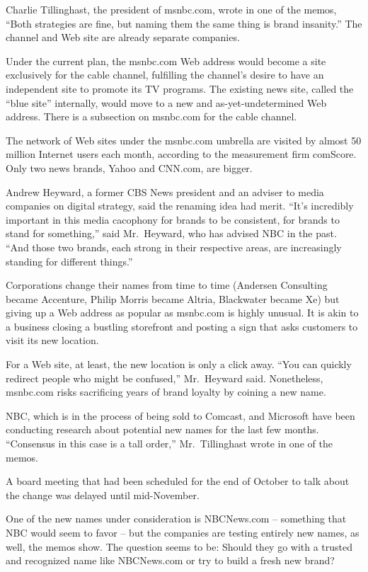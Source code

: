 ﻿\documentclass[12pt]{article}
\begin{document}
Charlie Tillinghast, the president of msnbc.com, wrote in one of the memos, ``Both strategies are
fine, but naming them the same thing is brand insanity.'' The channel and Web site are already
separate companies.

Under the current plan, the msnbc.com Web address would become a site exclusively for the cable
channel, fulfilling the channel's desire to have an independent site to promote its TV programs. The
existing news site, called the ``blue site'' internally, would move to a new and as-yet-undetermined
Web address. There is a subsection on msnbc.com for the cable channel.

The network of Web sites under the msnbc.com umbrella are visited by almost 50 million Internet
users each month, according to the measurement firm comScore. Only two news brands, Yahoo and
CNN.com, are bigger.

Andrew Heyward, a former CBS News president and an adviser to media companies on digital strategy,
said the renaming idea had merit. ``It's incredibly important in this media cacophony for brands to
be consistent, for brands to stand for something,'' said Mr.~Heyward, who has advised NBC in the
past. ``And those two brands, each strong in their respective areas, are increasingly standing for
different things.''

Corporations change their names from time to time (Andersen Consulting became Accenture, Philip
Morris became Altria, Blackwater became Xe) but giving up a Web address as popular as msnbc.com is
highly unusual. It is akin to a business closing a bustling storefront and posting a sign that asks
customers to visit its new location.

For a Web site, at least, the new location is only a click away. ``You can quickly redirect people
who might be confused,'' Mr.~Heyward said. Nonetheless, msnbc.com risks sacrificing years of brand
loyalty by coining a new name.

NBC, which is in the process of being sold to Comcast, and Microsoft have been conducting research
about potential new names for the last few months. ``Consensus in this case is a tall order,''
Mr.~Tillinghast wrote in one of the memos.

A board meeting that had been scheduled for the end of October to talk about the change was delayed
until mid-November.

One of the new names under consideration is NBCNews.com -- something that NBC would seem to favor --
but the companies are testing entirely new names, as well, the memos show. The question seems to be:
Should they go with a trusted and recognized name like NBCNews.com or try to build a fresh new
brand?
\end{document}
